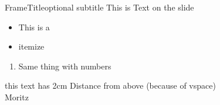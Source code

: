  
\begin{frame}[plain]{FrameTitle}{optional subtitle}
	This is Text on the slide
	\begin{itemize}
		\item This is a 
		\item itemize
	\end{itemize}
	\begin{enumerate}
		\item Same thing with numbers
	\end{enumerate}
	\vspace{2cm}
	this text has 2cm Distance from above (because of vspace)\\ %
	Moritz
\end{frame}